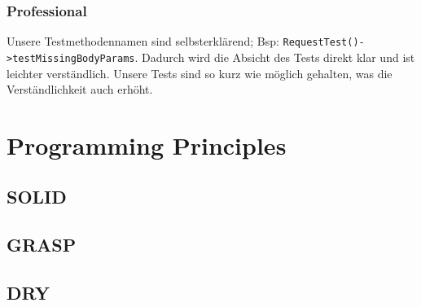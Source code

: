 \documentclass[12pt,a4paper,titlepage,ngerman,pdftex]{report}
\begin{document}
    \subsubsection{Professional}
    Unsere Testmethodennamen sind selbsterklärend; Bsp: \verb|RequestTest()->testMissingBodyParams|.
    Dadurch wird die Absicht des Tests direkt klar und ist leichter verständlich.
    Unsere Tests sind so kurz wie möglich gehalten, was die Verständlichkeit auch erhöht.

    \section{Programming Principles}
    \label{sec:programmingprinciples}

    \subsection{SOLID}
    \label{subsec:solid}
    
    \subsection{GRASP}
    \label{subsec:grasp}
    
    \subsection{DRY}
    \label{subsec:dry}
\end{document}
